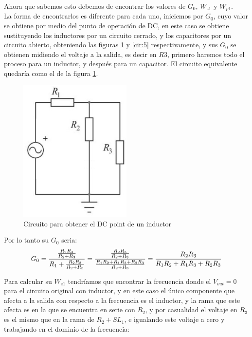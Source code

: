 \documentclass[letterpaper,spanish,12pt]{report}
\begin{document}
\medskip Ahora que sabemos esto debemos de encontrar los valores de $G_{0}$, $W_{z1}$ y $W_{p1}$. \medskip \\ La forma de encontrarlos es diferente para cada uno, iniciemos por $G_{0}$, cuyo valor se obtiene por medio del punto de operaci\'on de DC, en este caso se obtiene sustituyendo los inductores por un circuito cerrado, y los capacitores por un circuito abierto, obteniendo las figuras \ref{cir:3} y \ref{cir:5} respectivamente, y sus $G_{0}$ se obtienen midiendo el voltaje a la salida, es decir en $R3$, primero haremos todo el proceso para un inductor, y despu\'es para un capacitor. El circuito equivalente quedar\'ia como el de la figura \ref{cir:3}. \\ \medskip 

	\begin{figure}[h]
		\centering
			\includegraphics[width=0.50\textwidth]{Circuito2.eps}
		\caption{Circuito para obtener el DC point de un inductor}
		\label{cir:3}
	\end{figure}

Por lo tanto su $G_{0}$ seria: \\

	\begin{equation}
		\centering
		G_{0} = \frac { \frac {R_{2} R_{3}} {R_{2} + R_{3}} } {R_{1} + \frac {R_{2} R_{3}} {R_{2} + R_{3}} } =\frac { \frac {R_{2} R_{3}} {R_{2} + R_{3}} } {\frac {R_{1} R_{2} + R_{1} R_{3} + R_{2} R_{3} } {R_{2} + R_{3} } }  = \frac { R_{2} R_{3} } { R_{1} R_{2} +  R_{1} R_{3} + R_{2} R_{3} }
		\label{ecu:2}
	\end{equation}

Para calcular su $W_{z1}$ tendr\'iamos que encontrar la frecuencia donde el $V_{out} = 0$ para el circuito original con inductor, y en este caso el \'unico componente que afecta a la salida con respecto a la frecuencia es el inductor, y la rama que este afecta es en la que se encuentra en serie con $R_{2}$, y por casualidad el voltaje en $R_{3}$ es el mismo que en la rama de $R_{2}+SL_{1}$, e igualando este voltaje a cero y trabajando en el dominio de la frecuencia:
\end{document}
